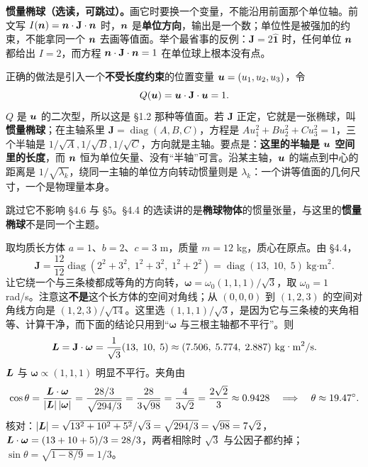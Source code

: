 \documentclass[11pt]{ctexart}
\newcommand{\ten}[1]{\mathbf{#1}}
\newcommand{\unitd}{\hat{\ten{1}}}
\let\origsubhdr\subhdr
\renewcommand{\subhdr}[1]{\par\needspace{3\baselineskip}\origsubhdr{#1}}
\begin{document}
\textbf{惯量椭球（选读，可跳过）。}画它时要换一个变量，不能沿用前面那个单位轴。前文写 $I(\vect n)=\vect n\cdot\ten J\cdot\vect n$ 时，$\boldsymbol{n}$ 是\textbf{单位方向}，输出是一个数；单位性是被强加的约束，不能拿同一个 $\boldsymbol{n}$ 去画等值面。举个最省事的反例：$\ten J=2\unitd$ 时，任何单位 $\boldsymbol{n}$ 都给出 $I=2$，而方程 $\vect n\cdot\ten J\cdot\vect n=1$ 在单位球上根本没有点。
\par\smallskip
正确的做法是引入一个\textbf{不受长度约束}的位置变量 $\boldsymbol{u}=(u_1,u_2,u_3)$，令
\[
Q(\vect u)=\vect u\cdot\ten J\cdot\vect u=1 .
\]
$Q$ 是 $\boldsymbol{u}$ 的二次型，所以这是 \S1.2 那种等值面。若 $\ten J$ 正定，它就是一张椭球，叫\textbf{惯量椭球}；在主轴系里 $\ten J=\operatorname{diag}(A,B,C)$，方程是 $Au_1^2+Bu_2^2+Cu_3^2=1$，三个半轴是 $1/\sqrt{A},1/\sqrt{B},1/\sqrt{C}$，方向就是主轴。要点是：\textbf{这里的半轴是 $\boldsymbol{u}$ 空间里的长度}，而 $\boldsymbol{n}$ 恒为单位矢量、没有“半轴”可言。沿某主轴，$\boldsymbol{u}$ 的端点到中心的距离是 $1/\sqrt{\lambda_k}$，绕同一主轴的单位方向转动惯量则是 $\lambda_k$：一个讲等值面的几何尺寸，一个是物理量本身。
\par\smallskip
跳过它不影响 \S4.6 与 \S5。\S4.4 的选读讲的是\textbf{椭球物体}的惯量张量，与这里的\textbf{惯量椭球}不是同一个主题。

\label{subsec:inertia-example}

取均质长方体 $a=1$、$b=2$、$c=3$ m，质量 $m=12$ kg，质心在原点。由 \S4.4，
\[
\ten J=\frac{12}{12}\operatorname{diag}(2^2+3^2,\;1^2+3^2,\;1^2+2^2)
=\operatorname{diag}(13,\;10,\;5)\ \text{kg·m}^2 .
\]
让它绕一个与三条棱都成等角的方向转，$\boldsymbol\omega=\omega_0(1,1,1)/\sqrt3$，取 $\omega_0=1$ rad/s。注意这\textbf{不是}这个长方体的空间对角线；从 $(0,0,0)$ 到 $(1,2,3)$ 的空间对角线方向是 $(1,2,3)/\sqrt{14}$。这里选 $(1,1,1)/\sqrt3$，是因为它与三条棱的夹角相等、计算干净，而下面的结论只用到“$\boldsymbol\omega$ 与三根主轴都不平行”。则
\[
\vect L=\ten J\cdot\boldsymbol\omega=\frac{1}{\sqrt3}(13,\;10,\;5)\approx(7.506,\;5.774,\;2.887)\ \text{kg·m}^2/\text{s}.
\]
$\boldsymbol{L}$ 与 $\boldsymbol\omega\propto(1,1,1)$ 明显不平行。夹角由
\[
\cos\theta=\frac{\boldsymbol{L}\cdot\boldsymbol\omega}{|\boldsymbol{L}|\,|\boldsymbol\omega|}
=\frac{28/3}{\sqrt{294/3}}
=\frac{28}{3\sqrt{98}}=\frac{4}{3\sqrt2}=\frac{2\sqrt2}{3}\approx0.9428
\quad\Longrightarrow\quad
\theta\approx19.47^\circ .
\]
核对：$|\boldsymbol{L}|=\sqrt{13^2+10^2+5^2}/\sqrt3=\sqrt{294/3}=\sqrt{98}=7\sqrt2$，$\boldsymbol{L}\cdot\boldsymbol\omega=(13+10+5)/3=28/3$，两者相除时 $\sqrt3$ 与公因子都约掉；$\sin\theta=\sqrt{1-8/9}=1/3$。
\end{document}
